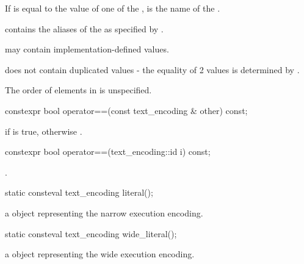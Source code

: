 \documentclass{wg21}
\begin{document}
\begin{addedblock}
\begin{itemdescr}
\pnum If  is equal to the  value of one of the ,  is the name of the .

 contains the aliases of the  as specified by \cite{rfc2978}.

\pnum {} may contain implementation-defined values.

\pnum {} does not contain duplicated values - the equality of 2 values is determined by .

\begin{note}
The order of elements in  is unspecified.
\end{note}

\end{itemdescr}

\begin{itemdecl}
constexpr bool operator==(const text_encoding & other) const;
\end{itemdecl}

\begin{itemdescr}
\returns
{} if  is true,
otherwise
.
\end{itemdescr}

\begin{itemdecl}
constexpr bool operator==(text_encoding::id i) const;
\end{itemdecl}

\begin{itemdescr}
\returns {}.
\end{itemdescr}

\begin{itemdecl}
static consteval text_encoding literal();
\end{itemdecl}

\begin{itemdescr}
    \returns a  object representing the narrow execution encoding.
\end{itemdescr}

\begin{itemdecl}
static consteval text_encoding wide_literal();
\end{itemdecl}

\begin{itemdescr}
    \returns a  object representing the wide execution encoding.
\end{itemdescr}


\end{addedblock}
\end{document}
